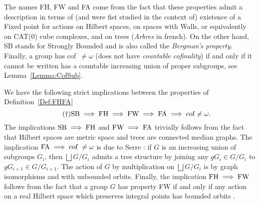 \documentclass[a4paper]{article}
\theoremstyle{definition}
\begin{document}
The names FH, FW and FA come from the fact that these properties admit a description in terms of (and were fist studied in the context of) existence of a Fixed point for actions on Hilbert spaces, on spaces with Walls, or equivalently on CAT(0) cube complexes, and on trees (\emph{Arbres} in french).
On the other hand, SB stands for Strongly Bounded and is also called the \emph{Bergman's property}.
Finally, a group has cof~$\neq\omega$ (does not have \emph{countable cofinality}) if and only if it cannot be written has a countable increasing union of proper subgroups, see Lemma~\ref{Lemma:CofSub}.

We have the following strict implications between the properties of Definition~\ref{Def:FHFA} %
\begin{equation}\tag{\dag}\label{EQ:Implications}
	\textnormal{SB}\implies \textnormal{FH}\implies \textnormal{FW}\implies \textnormal{FA}\implies\textnormal{cof~$\neq\omega$}.
\end{equation}
The implications $\textnormal{SB}\implies \textnormal{FH}$ and $\textnormal{FW}\implies \textnormal{FA}$ trivially follows from the fact that Hilbert spaces are metric space and trees are connected median graphs.
The implication $\textnormal{FA}\implies\textnormal{cof~}\neq\omega$ is due to Serre \cite{MR0476875}: if $G$ is an increasing union of subgroups $G_i$, then $\bigsqcup G/G_i$ admits a tree structure by joining any $gG_i\in G/G_i$ to $gG_{i+1}\in G/G_{i+1}$. The action of $G$ by multiplication on $\bigsqcup G/G_i$ is by graph isomorphisms and with unbounded orbits.
Finally, the implication $\textnormal{FH}\implies \textnormal{FW}$ follows from the fact that a group $G$ has property FW if and only if any action on a real Hilbert space which preserves integral points has bounded orbits \cite{Cornulier2013}.
\end{document}
